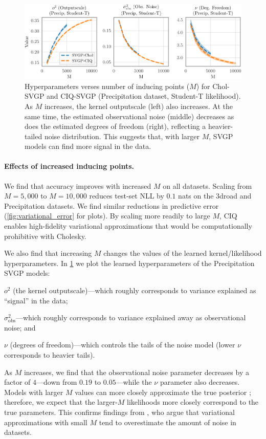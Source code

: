 \begin{figure}[t!]
  \centering
  \includegraphics[width=\linewidth]{figures/variational_stats.pdf}
  \caption[Train time comparison of Cholesky-whitened vs CIQ-whitened SVGP models.]{
    Hyperparameters verses number of inducing points ($M$) for Chol-SVGP and CIQ-SVGP (Precipitation dataset, Student-T likelihood).
    As $M$ increases, the kernel outputscale (left) also increases.
    At the same time, the estimated observational noise (middle) decreases as does the estimated degrees of freedom (right), reflecting a heavier-tailed noise distribution.
    This suggests that, with larger $M$, SVGP models can find more signal in the data.
  }
  \label{fig:variational_stats}
\end{figure}

\paragraph{Effects of increased inducing points.}
We find that accuracy improves with increased $M$ on all datasets.
Scaling from $M=5,\!000$ to $M=10,\!000$ reduces test-set NLL by $0.1$ nats on the 3droad and Precipitation datasets.
We find similar reductions in predictive error (\cref{fig:variational_error} for plots).
By scaling more readily to large $M$, CIQ enables high-fidelity variational approximations that would be computationally prohibitive with Cholesky.

We also find that increasing $M$ changes the values of the learned kernel/likelihood hyperparameters.
In \cref{fig:variational_stats} we plot the learned hyperparameters of the Precipitation SVGP models:
%
\begin{enumerate*}
  \item $o^2$ (the kernel outputscale)---which roughly corresponds to variance explained as ``signal'' in the data;
  \item $\sigma^2_\text{obs}$---which roughly corresponds to variance explained away as observational noise; and
  \item $\nu$ (degrees of freedom)---which controls the tails of the noise model (lower $\nu$ corresponds to heavier tails).
\end{enumerate*}
%
As $M$ increases, we find that the observational noise parameter decreases by a factor of $4$---down from $0.19$ to $0.05$---while the $\nu$ parameter also decreases.
Models with larger $M$ values can more closely approximate the true posterior \cite{hensman2013gaussian}; therefore, we expect that the larger-$M$ likelihoods more closely correspond to the true parameters.
This confirms findings from \citet{bauer2016understanding}, who argue that variational approximations with small $M$ tend to overestimate the amount of noise in datasets.
